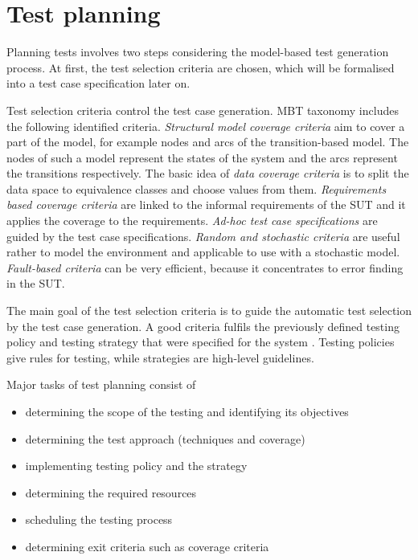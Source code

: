 

\section{Test planning}
\label{sec:testplanning}

Planning tests involves two steps considering the model-based test generation process. At first, the test selection criteria are chosen, which will be formalised into a test case specification later on.

Test selection criteria control the test case generation. MBT taxonomy includes the following identified criteria. \textit{Structural model coverage criteria} aim to cover a part of the model, for example nodes and arcs of the transition-based model. The nodes of such a model represent the states of the system and the arcs represent the transitions respectively. The basic idea of \textit{data coverage criteria} is to split the data space to equivalence classes and choose values from them. \textit{Requirements based coverage criteria} are linked to the informal requirements of the SUT and it applies the coverage to the requirements. \textit{Ad-hoc test case specifications} are guided by the test case specifications. \textit{Random and stochastic criteria} are useful rather to model the environment and applicable to use with a stochastic model. \textit{Fault-based criteria} can be very efficient, because it concentrates to error finding in the SUT.

The main goal of the test selection criteria is to guide the automatic test selection by the test case generation. A good criteria fulfils the previously defined testing policy and testing strategy that were specified for the system \cite{istqb}. Testing policies give rules for testing, while strategies are high-level guidelines.

Major tasks of test planning consist of

\begin{itemize}
	\item determining the scope of the testing and identifying its objectives
	\item determining the test approach (techniques and coverage)
	\item implementing testing policy and the strategy
	\item determining the required resources
	\item scheduling the testing process
	\item determining exit criteria such as coverage criteria
\end{itemize}

